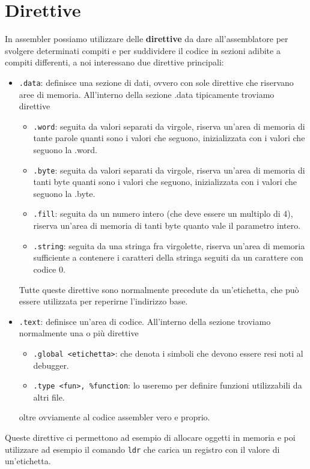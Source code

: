 \section{Direttive}
In assembler possiamo utilizzare delle \textbf{direttive} da dare all'assemblatore per svolgere
determinati compiti e per suddividere il codice in sezioni adibite a compiti differenti, a noi
interessano due direttive principali:
\begin{itemize}
	\item \verb|.data|: definisce una sezione di dati, ovvero con sole direttive che riservano aree
	      di memoria. All'interno della sezione .data tipicamente troviamo direttive
	      \begin{itemize}
		      \item \verb|.word|: seguita da valori separati da virgole, riserva un'area di
		            memoria di tante parole quanti sono i valori che seguono, inizializzata con i
		            valori che seguono la .word.
		      \item \verb|.byte|: seguita da valori separati da virgole, riserva un'area di
		            memoria di tanti byte quanti sono i valori che seguono, inizializzata con i
		            valori che seguono la .byte.
		      \item \verb|.fill|: seguita da un numero intero (che deve essere un multiplo di 4),
		            riserva un'area di memoria di tanti byte quanto vale il parametro intero.
		      \item \verb|.string|: seguita da una stringa fra virgolette, riserva un'area di
		            memoria sufficiente a contenere i caratteri della stringa seguiti da un
		            carattere con codice 0.
	      \end{itemize}
	      Tutte queste direttive sono normalmente precedute da un'etichetta, che può essere
	      utilizzata per reperirne l'indirizzo base.
	\item \verb|.text|: definisce un'area di codice. All'interno della sezione troviamo normalmente
	      una o più direttive
	      \begin{itemize}
		      \item \verb|.global <etichetta>|: che denota i simboli che devono essere resi noti al
		            debugger.
		      \item \verb|.type <fun>, %function|: lo useremo per definire funzioni utilizzabili da
		            altri file.
	      \end{itemize}
	      oltre ovviamente al codice assembler vero e proprio.
\end{itemize}
Queste direttive ci permettono ad esempio di allocare oggetti in memoria e poi utilizzare ad
esempio il comando \verb|ldr| che carica un registro con il valore di un'etichetta.